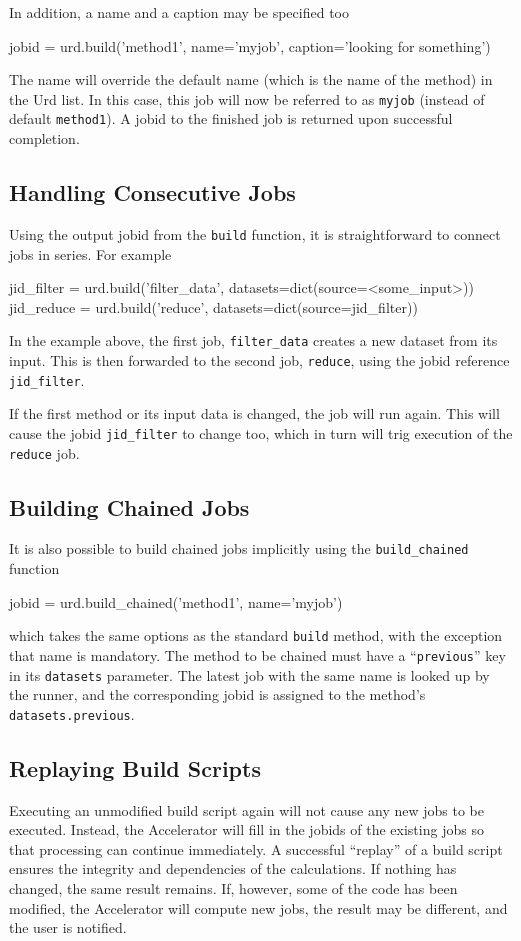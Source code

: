 In addition, a name and a caption may be specified too
\begin{python}
jobid = urd.build('method1', name='myjob', caption='looking for something')
\end{python}
The name will override the default name (which is the name of the
method) in the Urd list.  In this case, this job will now be referred
to as \texttt{myjob} (instead of default \texttt{method1}).  A jobid
to the finished job is returned upon successful completion.



\subsection{Handling Consecutive Jobs}
Using the output jobid from the \texttt{build} function, it is
straightforward to connect jobs in series.  For example
\begin{python}
jid_filter = urd.build('filter_data', datasets=dict(source=<some_input>))
jid_reduce = urd.build('reduce', datasets=dict(source=jid_filter))
\end{python}
In the example above, the first job, \texttt{filter\_data} creates a
new dataset from its input.  This is then forwarded to the second job,
\texttt{reduce}, using the jobid reference \texttt{jid\_filter}.

If the first method or its input data is changed, the job will run
again.  This will cause the jobid \texttt{jid\_filter} to change too,
which in turn will trig execution of the \texttt{reduce} job.



\subsection{Building Chained Jobs}
It is also possible to build chained jobs implicitly using the
\texttt{build\_chained} function
\begin{python}
jobid = urd.build_chained('method1', name='myjob')
\end{python}
which takes the same options as the standard \texttt{build} method,
with the exception that name is mandatory.  The method to be chained
must have a ``\texttt{previous}'' key in its \texttt{datasets}
parameter.  The latest job with the same name is looked up by the
runner, and the corresponding jobid is assigned to the
method's \texttt{datasets.previous}.



\subsection{Replaying Build Scripts}
Executing an unmodified build script again will not cause any new jobs
to be executed.  Instead, the Accelerator will fill in the jobids of
the existing jobs so that processing can continue immediately.  A
successful ``replay'' of a build script ensures the integrity and
dependencies of the calculations.  If nothing has changed, the same
result remains.  If, however, some of the code has been modified, the
Accelerator will compute new jobs, the result may be different, and
the user is notified.




